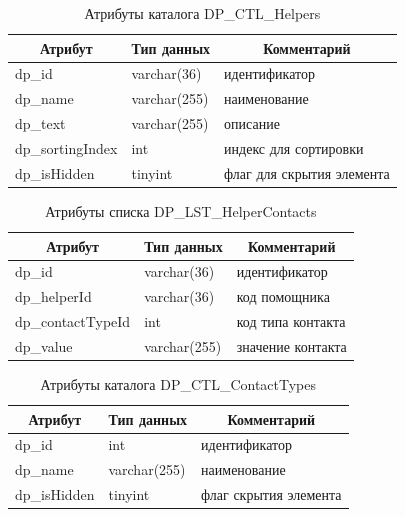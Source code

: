 \begin{table}[p]
    \centering\small

    \caption{Атрибуты каталога DP\_CTL\_Helpers}
    \label{tab:DP_CTL_Helpers}

    \begin{tabular}{|p{5cm}|p{2.5cm}|p{9cm}|}
        \hline
        \multicolumn{1}{|c|}{Атрибут}
        & \multicolumn{1}{c|}{Тип данных}
        & \multicolumn{1}{c|}{Комментарий}
        \\ \hline

        dp\_id & varchar(36) & идентификатор \\ \hline
        dp\_name & varchar(255) & наименование \\ \hline
        dp\_text & varchar(255) & описание \\ \hline
        dp\_sortingIndex & int & индекс для сортировки \\ \hline
        dp\_isHidden & tinyint & флаг для скрытия элемента \\ \hline
    \end{tabular}
\end{table}

\begin{table}[p]
    \centering\small

    \caption{Атрибуты списка DP\_LST\_HelperContacts}
    \label{tab:DP_LST_HelperContacts}

    \begin{tabular}{|p{5cm}|p{2.5cm}|p{9cm}|}
        \hline
        \multicolumn{1}{|c|}{Атрибут}
        & \multicolumn{1}{c|}{Тип данных}
        & \multicolumn{1}{c|}{Комментарий}
        \\ \hline

        dp\_id & varchar(36) & идентификатор \\ \hline
        dp\_helperId & varchar(36) & код помощника \\ \hline
        dp\_contactTypeId & int & код типа контакта \\ \hline
        dp\_value & varchar(255) & значение контакта \\ \hline
    \end{tabular}
\end{table}

\begin{table}[p]
    \centering\small

    \caption{Атрибуты каталога DP\_CTL\_ContactTypes}
    \label{tab:DP_CTL_ContactTypes}

    \begin{tabular}{|p{5cm}|p{2.5cm}|p{9cm}|}
        \hline
        \multicolumn{1}{|c|}{Атрибут}
        & \multicolumn{1}{c|}{Тип данных}
        & \multicolumn{1}{c|}{Комментарий}
        \\ \hline

        dp\_id & int & идентификатор \\ \hline
        dp\_name & varchar(255) & наименование \\ \hline
        dp\_isHidden & tinyint & флаг скрытия элемента \\ \hline
    \end{tabular}
\end{table}

